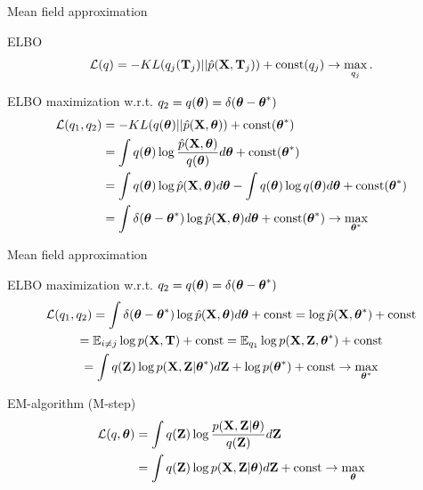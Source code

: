 \begin{frame}{Mean field approximation}
	\begin{block}{ELBO}
		\[
			\mathcal{L} (q) = - KL (q_j(\mathbf{T}_j) || \hat{p}(\mathbf{X}, \mathbf{T}_j))  + \text{const}(q_j) \rightarrow \max_{q_j}.
		\]
	\vspace{-0.3cm}
	\end{block}
	\begin{block}{ELBO maximization w.r.t. $q_2 = q(\boldsymbol{\theta}) = \delta(\boldsymbol{\theta} - \boldsymbol{\theta}^*)$}
		\vspace{-0.3cm}
		\begin{align*}
			\mathcal{L} (q_1, q_2) &= - KL (q(\boldsymbol{\theta}) || \hat{p}(\mathbf{X}, \boldsymbol{\theta}))  + \text{const}(\boldsymbol{\theta}^*) \\ 
			&= \int q (\boldsymbol{\theta}) \log \frac{\hat{p}(\mathbf{X}, \boldsymbol{\theta})}{q(\boldsymbol{\theta})} d\boldsymbol{\theta} + \text{const}(\boldsymbol{\theta}^*) \\
			& = \int q (\boldsymbol{\theta}) \log \hat{p}(\mathbf{X}, \boldsymbol{\theta}) d\boldsymbol{\theta}  - \int q (\boldsymbol{\theta}) \log q(\boldsymbol{\theta}) d\boldsymbol{\theta} + \text{const}(\boldsymbol{\theta}^*) \\
			& = \int \delta(\boldsymbol{\theta} - \boldsymbol{\theta}^*) \log \hat{p}(\mathbf{X}, \boldsymbol{\theta}) d\boldsymbol{\theta} + \text{const}(\boldsymbol{\theta}^*) \rightarrow \max_{\boldsymbol{\theta}^*}
		\end{align*}
		\vspace{-0.3cm}
	\end{block}
\end{frame}
\begin{frame}{Mean field approximation}
	
	\begin{block}{ELBO maximization w.r.t. $q_2 = q(\boldsymbol{\theta}) = \delta(\boldsymbol{\theta} - \boldsymbol{\theta}^*)$}
		\vspace{-0.3cm}
		\begin{multline*}
			\mathcal{L} (q_1, q_2) = \int \delta(\boldsymbol{\theta} - \boldsymbol{\theta}^*) \log \hat{p}(\mathbf{X}, \boldsymbol{\theta}) d\boldsymbol{\theta} + \text{const}
			= \log \hat{p}(\mathbf{X}, \boldsymbol{\theta}^*)  + \text{const} \\
			= \mathbb{E}_{i \neq j} \log p(\mathbf{X}, \mathbf{T}) + \text{const} = \mathbb{E}_{q_1} \log p(\mathbf{X}, \mathbf{Z}, \boldsymbol{\theta}^*) + \text{const} \\
		= \int q(\mathbf{Z}) \log p(\mathbf{X}, \mathbf{Z}|  \boldsymbol{\theta}^*) d\mathbf{Z} + \log p(\boldsymbol{\theta}^*)+ \text{const}\rightarrow \max_{\boldsymbol{\theta}^*}
	\end{multline*}
	\end{block}
	\vspace{-0.3cm}
	\begin{block}{EM-algorithm (M-step)}
		\vspace{-0.3cm}
		 \begin{align*}
		 	\mathcal{L}(q, \boldsymbol{\theta}) &= \int q(\mathbf{Z}) \log \frac{p(\mathbf{X}, \mathbf{Z} | \boldsymbol{\theta})}{q(\mathbf{Z})}d\mathbf{Z} \\
		 	&= \int q(\mathbf{Z}) \log p(\mathbf{X}, \mathbf{Z} | \boldsymbol{\theta}) d\mathbf{Z} + \text{const} \rightarrow \max_{\boldsymbol{\theta}}
		 \end{align*}
	\end{block}
\end{frame}

